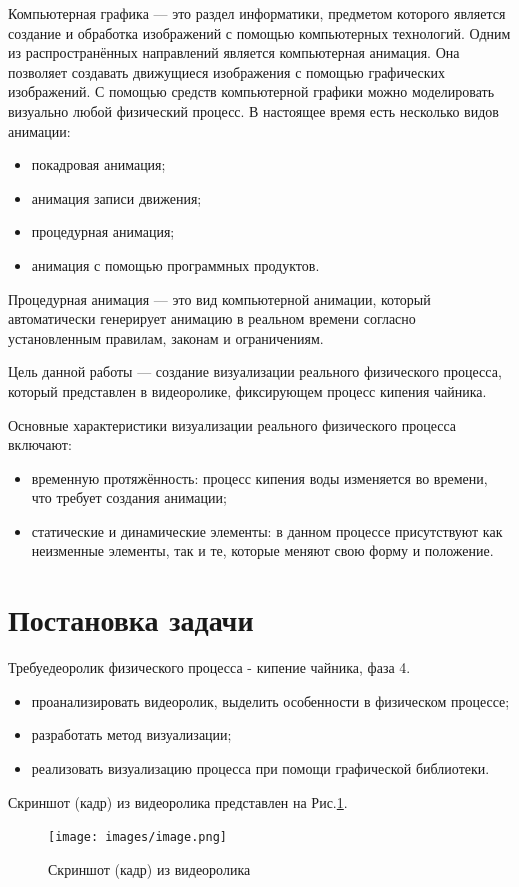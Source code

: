 \documentclass[areasetadvanced]{scrartcl}
\begin{document}
Компьютерная графика — это раздел информатики, предметом которого является создание и обработка изображений с помощью компьютерных технологий. Одним из распространённых направлений является компьютерная анимация. Она позволяет создавать движущиеся изображения с помощью графических изображений. С помощью средств компьютерной графики можно моделировать визуально любой физический процесс. В настоящее время есть несколько видов анимации:
\begin{itemize}
    \item покадровая анимация;
    \item анимация записи движения;
    \item процедурная анимация;
    \item анимация с помощью программных продуктов.
\end{itemize}

Процедурная анимация — это вид компьютерной анимации, который автоматически генерирует анимацию в реальном времени согласно установленным правилам, законам и ограничениям.

Цель данной работы — создание визуализации реального физического процесса, который представлен в видеоролике, фиксирующем процесс кипения чайника.

Основные характеристики визуализации реального физического процесса включают:
\begin{itemize}
    \item временную протяжённость: процесс кипения воды изменяется во времени, что требует создания анимации;
    \item статические и динамические элементы: в данном процессе присутствуют как неизменные элементы, так и те, которые меняют свою форму и положение.
\end{itemize}
\newpage
\section{Постановка задачи}
Требуедеоролик физического процесса - кипение чайника, фаза 4.
\begin{itemize}
    \item проанализировать видеоролик, выделить особенности в физическом процессе;
    \item разработать метод визуализации;
    \item реализовать визуализацию процесса при помощи графической библиотеки.
\end{itemize}
Скриншот (кадр) из видеоролика представлен на Рис.\ref{fig:first}.
\begin{figure}[H]
    \centering
    \texttt{[image: images/image.png]}
    \caption{Скриншот (кадр) из видеоролика}
    \label{fig:first}
\end{figure}
\end{document}
